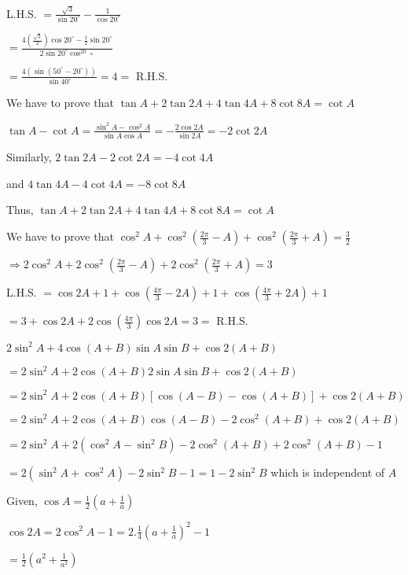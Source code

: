   L.H.S. $= \frac{\sqrt{3}}{\sin20^\circ} - \frac{1}{\cos20^\circ}$

  $= \frac{4(\frac{\sqrt{3}}{2})\cos20^\circ - \frac{1}{2}\sin20^\circ}{2\sin20^\circ\cos^20\circ}$

  $= \frac{4(\sin(50^\circ - 20^\circ))}{\sin40^\circ} = 4 =$ R.H.S.

\item We have to prove that $\tan A + 2\tan 2A + 4\tan 4A + 8\cot 8A = \cot A$

  $\tan A - \cot A = \frac{\sin^2A - \cos^2A}{\sin A\cos A} = -\frac{2\cos 2A}{\sin 2A} = -2\cot 2A$

  Similarly, $2\tan 2A - 2\cot 2A = -4\cot 4A$

  and $4\tan 4A - 4\cot 4A = -8\cot 8A$

  Thus, $\tan A + 2\tan 2A + 4\tan 4A + 8\cot 8A = \cot A$

\item We have to prove that $\cos^2A + \cos^2\left(\frac{2\pi}{3} - A\right) + \cos^2\left(\frac{2\pi}{3} + A\right) =
  \frac{3}{2}$

  $\Rightarrow 2\cos^2A + 2\cos^2\left(\frac{2\pi}{3} - A\right) + 2\cos^2\left(\frac{2\pi}{3} + A\right) = 3$

  L.H.S. $= \cos 2A + 1 + \cos\left(\frac{4\pi}{3} - 2A\right) + 1 + \cos\left(\frac{4\pi}{3} + 2A\right) + 1$

  $= 3 + \cos2A + 2\cos\left(\frac{4\pi}{3}\right)\cos2A = 3 =$ R.H.S.

\item $2\sin^2A + 4\cos (A + B)\sin A\sin B + \cos2(A + B)$

  $= 2\sin^2A + 2\cos(A + B)2\sin A\sin B + \cos2(A + B)$

  $= 2\sin^2A + 2\cos(A + B)[\cos(A - B) - \cos(A + B)] + \cos2(A + B)$

  $= 2\sin^2A + 2\cos(A + B)\cos(A - B) - 2\cos^2(A + B) + \cos2(A + B)$

  $= 2\sin^2A + 2(\cos^2A - \sin^2B) - 2\cos^2(A + B) + 2\cos^2(A + B) - 1$

  $= 2(\sin^2A + \cos^2A) -2\sin^2B - 1 = 1 -2\sin^2B$ which is independent of $A$

\item Given, $\cos A = \frac{1}{2}\left(a + \frac{1}{a}\right)$

  $\cos 2A = 2\cos^2A - 1 = 2.\frac{1}{4}\left(a + \frac{1}{a}\right)^2 - 1$

  $= \frac{1}{2}\left(a^2 + \frac{1}{a^2}\right)$

